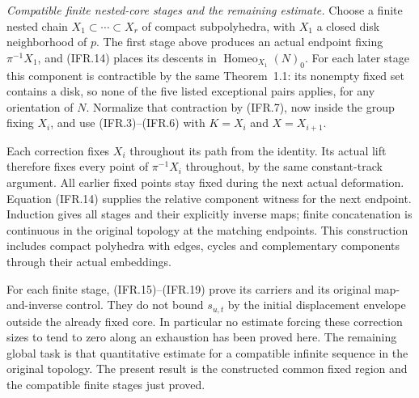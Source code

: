\emph{Compatible finite nested-core stages and the remaining estimate.}
Choose a finite nested chain $X_1\subset\cdots\subset X_r$ of
compact subpolyhedra, with $X_1$ a closed disk neighborhood of $p$.
The first stage above produces an actual endpoint fixing
$\pi^{-1}X_1$, and (IFR.14) places its descents in
$\operatorname{Homeo}_{X_1}(N)_0$.
For each later stage this component is contractible by the same
Theorem~1.1: its nonempty fixed set contains a disk, so none of the
five listed exceptional pairs applies, for any orientation of $N$.
Normalize that contraction by (IFR.7), now inside the group fixing
$X_i$, and use (IFR.3)--(IFR.6) with $K=X_i$ and $X=X_{i+1}$.

Each correction fixes $X_i$ throughout its path from the identity.
Its actual lift therefore fixes every point of $\pi^{-1}X_i$
throughout, by the same constant-track argument. All earlier fixed
points stay fixed during the next actual deformation. Equation
(IFR.14) supplies the relative component witness for the next endpoint.
Induction gives all stages and their explicitly inverse maps; finite
concatenation is continuous in the original topology at the matching
endpoints. This construction includes compact polyhedra with edges,
cycles and complementary components through their actual embeddings.

For each finite stage, (IFR.15)--(IFR.19) prove its carriers and its
original map-and-inverse control. They do not bound $s_{u,t}$ by the
initial displacement envelope outside the already fixed core.
In particular no estimate forcing these correction sizes to tend to
zero along an exhaustion has been proved here. The remaining global
task is that quantitative estimate for a compatible infinite sequence
in the original topology. The present result is the constructed
common fixed region and the compatible finite stages just proved.
